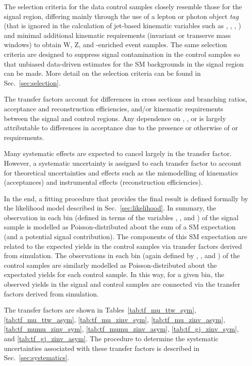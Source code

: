 The selection criteria for the data control samples closely resemble
those for the signal region, differing mainly through the use of a
lepton or photon object {\it tag} (that is ignored in the calculation
of jet-based kinematic variables such as \scalht, \mht, \alphat, \etc)
and minimal additional kinematic requirements (\eg invariant or
transerve mass windows) to obtain W, Z, and \ttbar-enriched event
samples. The same selection criteria are designed to suppress signal
contamination in the control samples so that unbiased data-driven
estimates for the SM backgrounds in the signal region can be
made. More detail on the selection criteria can be found in Sec.~\ref{sec:selection}.

The transfer factors account for differences in cross sections and
branching ratios, acceptance and reconstruction efficiencies, and/or
kinematic requirements between the signal and control regions. Any
dependence on \njet, \nb, or \HT is largely attributable to
differences in acceptance due to the presence or otherwise of \alphat
or \mht requirements.

Many systematic effects are expected to cancel largely in the transfer
factor. However, a systematic uncertainty is assigned to each transfer
factor to account for theoretical uncertainties and effects such as
the mismodelling of kinematics (\eg acceptances) and instrumental
effects (\eg reconstruction efficiencies).

In the end, a fitting procedure that provides the final result is
defined formally by the likelihood model described in
Sec.~\ref{sec:likelihood}. In summary, the observation in each bin
(defined in terms of the variables \njet, \nb, and \scalht) of the
signal sample is modelled as Poisson-distributed about the sum of a SM
expectation (and a potential signal contribution). The components of
this SM expectation are related to the expected yields in the control
samples via transfer factors derived from simulation. The observations
in each bin (again defined by \njet, \nb, and \scalht) of the control
samples are similarly modelled as Poisson-distributed about the
expectated yields for each control sample. In this way, for a given
bin, the observed yields in the signal and control samples are
connected via the transfer factors derived from simulation. 

The transfer factors are shown in Tables~\ref{tab:tf_mu_ttw_sym},
\ref{tab:tf_mu_ttw_asym}, \ref{tab:tf_mu_zinv_sym},
\ref{tab:tf_mu_zinv_asym}, \ref{tab:tf_mumu_zinv_sym},
\ref{tab:tf_mumu_zinv_asym}, \ref{tab:tf_gj_zinv_sym}, and
\ref{tab:tf_gj_zinv_asym}. The procedure to determine the systematic
uncertainties associated with these transfer factors is described in
Sec.~\ref{sec:systematics}.

